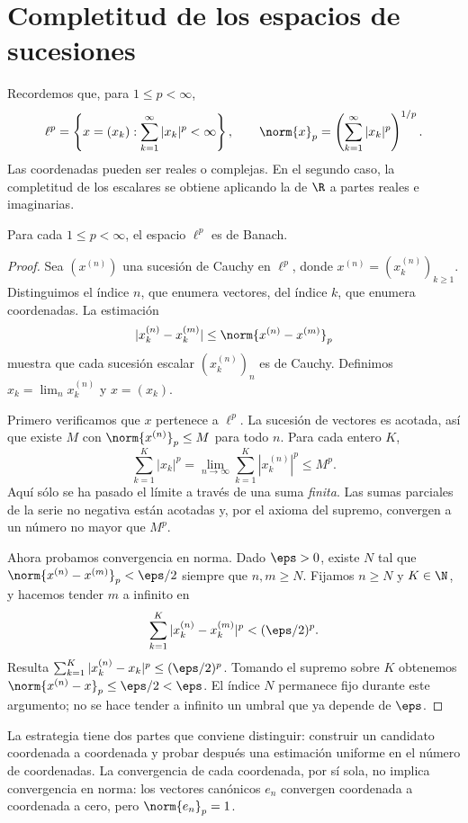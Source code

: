 \section{Completitud de los espacios de sucesiones}
Recordemos que, para $1\leq p<\infty$,
\[
 \ell^p=\left\{x=(x_k):\sum_{k=1}^\infty|x_k|^p<\infty\right\},
 \qquad \norm{x}_p=\left(\sum_{k=1}^\infty|x_k|^p\right)^{1/p}.
\]
Las coordenadas pueden ser reales o complejas. En el segundo caso, la completitud de los escalares se obtiene aplicando la de $\R$ a partes reales e imaginarias.

\begin{teorema}\label{ch08:lp-completo}
Para cada $1\leq p<\infty$, el espacio $\ell^p$ es de Banach.
\end{teorema}
\begin{proof}
Sea $(x^{(n)})$ una sucesión de Cauchy en $\ell^p$, donde $x^{(n)}=(x^{(n)}_k)_{k\geq1}$. Distinguimos el índice $n$, que enumera vectores, del índice $k$, que enumera coordenadas. La estimación
\[
 |x^{(n)}_k-x^{(m)}_k|\leq\norm{x^{(n)}-x^{(m)}}_p
\]
muestra que cada sucesión escalar $(x^{(n)}_k)_n$ es de Cauchy. Definimos $x_k=\lim_nx^{(n)}_k$ y $x=(x_k)$.

Primero verificamos que $x$ pertenece a $\ell^p$. La sucesión de vectores es acotada, así que existe $M$ con $\norm{x^{(n)}}_p\leq M$ para todo $n$. Para cada entero $K$,
\[
 \sum_{k=1}^K|x_k|^p
 =\lim_{n\to\infty}\sum_{k=1}^K|x^{(n)}_k|^p\leq M^p.
\]
Aquí sólo se ha pasado el límite a través de una suma \emph{finita}. Las sumas parciales de la serie no negativa están acotadas y, por el axioma del supremo, convergen a un número no mayor que $M^p$.

Ahora probamos convergencia en norma. Dado $\eps>0$, existe $N$ tal que $\norm{x^{(n)}-x^{(m)}}_p<\eps/2$ siempre que $n,m\geq N$. Fijamos $n\geq N$ y $K\in\N$, y hacemos tender $m$ a infinito en
\[
 \sum_{k=1}^K|x^{(n)}_k-x^{(m)}_k|^p<(\eps/2)^p.
\]
Resulta $\sum_{k=1}^K|x^{(n)}_k-x_k|^p\leq(\eps/2)^p$. Tomando el supremo sobre $K$ obtenemos $\norm{x^{(n)}-x}_p\leq\eps/2<\eps$. El índice $N$ permanece fijo durante este argumento; no se hace tender a infinito un umbral que ya depende de $\eps$.
\end{proof}
La estrategia tiene dos partes que conviene distinguir: construir un candidato coordenada a coordenada y probar después una estimación uniforme en el número de coordenadas. La convergencia de cada coordenada, por sí sola, no implica convergencia en norma: los vectores canónicos $e_n$ convergen coordenada a coordenada a cero, pero $\norm{e_n}_p=1$.

